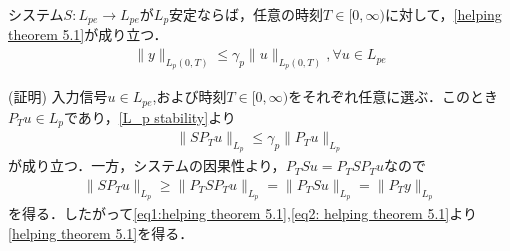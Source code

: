 \documentclass[a4paper,11pt,uplatex]{jsarticle} %
\theoremstyle{definition}	%
\begin{document}
\begin{tcolorbox}[title=補題5.1,
drop small lifted shadow=black]
システム$S: L_{pe} \to L_{pe}$が$L_p$安定ならば，任意の時刻$T \in [0, \infty )$に対して，\eqref{helping theorem 5.1}が成り立つ．
\begin{align}
\label{helping theorem 5.1}
\| y \|_{L_p (0, T)} \leq \gamma_p \| u \|_{L_p (0, T)}, \forall u \in L_{pe}
\end{align}

(証明) 入力信号$u \in L_{pe}$,および時刻$T \in [0, \infty)$をそれぞれ任意に選ぶ．このとき$P_T u \in L_p$であり，\eqref{L_p stability}より
\begin{align}
\label{eq1:helping theorem 5.1}
\| S P_T u \|_{L_p} \leq \gamma_p \| P_T u \|_{L_p}
\end{align}
が成り立つ．一方，システムの因果性より，$P_T S u = P_T S P_T u $なので
\begin{align}
\label{eq2: helping theorem 5.1}
\| S P_T u \|_{L_p} \geq \| P_T S P_T u \|_{L_p} = \| P_T S u \|_{L_p} = \| P_T y \|_{L_p}
\end{align}
を得る．したがって\eqref{eq1:helping theorem 5.1},\eqref{eq2: helping theorem 5.1}より\eqref{helping theorem 5.1}を得る．
\end{tcolorbox}



\end{document}

